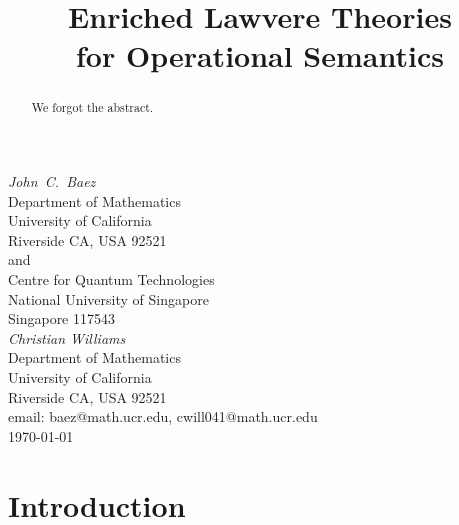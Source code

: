 \documentclass{amsart}
\theoremstyle{definition}
\begin{document}
\title{Enriched Lawvere Theories \\
for Operational Semantics}

\maketitle
\begin{center}   
  {\em John\ C.\ Baez \\}
  \vspace{0.3cm}
  {\small
 Department of Mathematics \\
    University of California \\
  Riverside CA, USA 92521 \\ and \\
 Centre for Quantum Technologies  \\
    National University of Singapore \\
    Singapore 117543  \\    } 
  \vspace{0.4cm}
{\em Christian Williams \\}
\vspace{0.3cm}
   {\small
   Department of Mathematics \\
  University of California \\
  Riverside CA, USA 92521 \\}
  \vspace{0.3cm}   
  {\small email:  baez@math.ucr.edu, cwill041@math.ucr.edu\\} 
  \vspace{0.3cm}   
  {\small \today}
  \vspace{0.3cm}   
\end{center} 

\begin{abstract} We forgot the abstract.
\end{abstract}

\section{Introduction}

\end{document}
